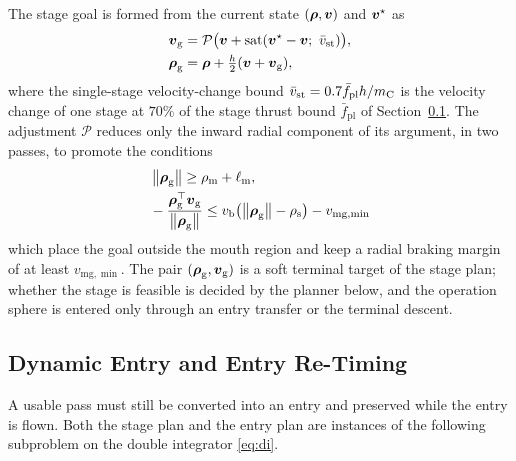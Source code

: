The stage goal is formed from the current state $(\boldsymbol{\rho},\boldsymbol{v})$ and $\boldsymbol{v}^{\star}$ as
\begin{equation}\label{eq:goal}
\begin{aligned}
\boldsymbol{v}_{\mathrm{g}}&=\mathcal{P}\bigl(\boldsymbol{v}+\operatorname{sat}(\boldsymbol{v}^{\star}-\boldsymbol{v};\ \bar v_{\mathrm{st}})\bigr),\\
\boldsymbol{\rho}_{\mathrm{g}}&=\boldsymbol{\rho}+\tfrac{h}{2}(\boldsymbol{v}+\boldsymbol{v}_{\mathrm{g}}),
\end{aligned}
\end{equation}
where the single-stage velocity-change bound $\bar v_{\mathrm{st}}=0.7\bar f_{\mathrm{pl}}h/m_{\mathrm{C}}$ is the velocity change of one stage at $70\%$ of the stage thrust bound $\bar f_{\mathrm{pl}}$ of Section~\ref{sec:entry}. The adjustment $\mathcal{P}$ reduces only the inward radial component of its argument, in two passes, to promote the conditions
\begin{equation}\label{eq:project}
\begin{aligned}
&\left\lVert \boldsymbol{\rho}_{\mathrm{g}} \right\rVert\ge\rho_{\mathrm{m}}+\ell_{\mathrm{m}},\\
&-\frac{\boldsymbol{\rho}_{\mathrm{g}}^{\top}\boldsymbol{v}_{\mathrm{g}}}{\left\lVert \boldsymbol{\rho}_{\mathrm{g}} \right\rVert}\le v_{\mathrm{b}}\bigl(\left\lVert \boldsymbol{\rho}_{\mathrm{g}} \right\rVert-\rho_{\mathrm{s}}\bigr)-v_{\mathrm{mg},\min}
\end{aligned}
\end{equation}
which place the goal outside the mouth region and keep a radial braking margin of at least $v_{\mathrm{mg},\min}$. The pair $(\boldsymbol{\rho}_{\mathrm{g}},\boldsymbol{v}_{\mathrm{g}})$ is a soft terminal target of the stage plan; whether the stage is feasible is decided by the planner below, and the operation sphere is entered only through an entry transfer or the terminal descent.

\subsection{Dynamic Entry and Entry Re-Timing}\label{sec:entry}

A usable pass must still be converted into an entry and preserved while the entry is flown. Both the stage plan and the entry plan are instances of the following subproblem on the double integrator \eqref{eq:di}.

